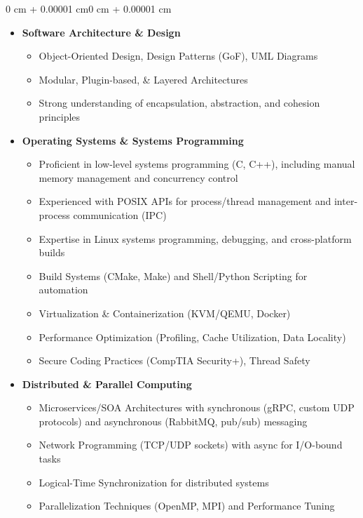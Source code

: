 \documentclass[10pt, letterpaper]{article}
\newenvironment{onecolentry}{
    \begin{adjustwidth}{0 cm + 0.00001 cm}{0 cm + 0.00001 cm}
}{
    \end{adjustwidth}
}
\begin{document}
\begin{onecolentry}
    \begin{itemize}[leftmargin=0.4 cm]
        \item \textbf{Software Architecture \& Design}
        \begin{itemize}
            \item Object-Oriented Design, Design Patterns (GoF), UML Diagrams
            \item Modular, Plugin-based, \& Layered Architectures
            \item Strong understanding of encapsulation, abstraction, and cohesion principles
        \end{itemize}

        \item \textbf{Operating Systems \& Systems Programming}
        \begin{itemize}
            \item Proficient in low-level systems programming (C, C++), including manual memory management and concurrency control
            \item Experienced with POSIX APIs for process/thread management and inter-process communication (IPC)
            \item Expertise in Linux systems programming, debugging, and cross-platform builds
            \item Build Systems (CMake, Make) and Shell/Python Scripting for automation
            \item Virtualization \& Containerization (KVM/QEMU, Docker)
            \item Performance Optimization (Profiling, Cache Utilization, Data Locality)
            \item Secure Coding Practices (CompTIA Security+), Thread Safety
        \end{itemize}

        \item \textbf{Distributed \& Parallel Computing}
        \begin{itemize}
            \item Microservices/SOA Architectures with synchronous (gRPC, custom UDP protocols) and asynchronous (RabbitMQ, pub/sub) messaging
            \item Network Programming (TCP/UDP sockets) with async for I/O-bound tasks
            \item Logical-Time Synchronization for distributed systems
            \item Parallelization Techniques (OpenMP, MPI) and Performance Tuning
        \end{itemize}


\end{itemize}
\end{onecolentry}
\end{document}
